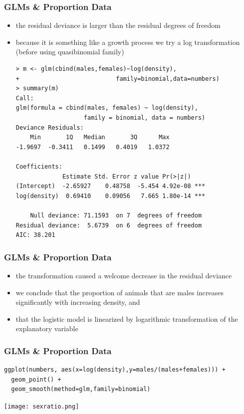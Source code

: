 \begin{frame}[fragile]\frametitle{GLMs \& Proportion Data}
  \begin{itemize}
  \item the residual deviance is larger than the residual degrees of freedom
  \item because it is something like a growth process we try a log transformation (before using quasibinomial family)\tiny
\begin{verbatim}
> m <- glm(cbind(males,females)~log(density),
+                           family=binomial,data=numbers)
> summary(m)
Call:
glm(formula = cbind(males, females) ~ log(density), 
                   family = binomial, data = numbers)
Deviance Residuals: 
    Min       1Q   Median       3Q      Max  
-1.9697  -0.3411   0.1499   0.4019   1.0372  

Coefficients:
             Estimate Std. Error z value Pr(>|z|)    
(Intercept)  -2.65927    0.48758  -5.454 4.92e-08 ***
log(density)  0.69410    0.09056   7.665 1.80e-14 ***

    Null deviance: 71.1593  on 7  degrees of freedom
Residual deviance:  5.6739  on 6  degrees of freedom
AIC: 38.201
\end{verbatim}
  \end{itemize}
\end{frame}

\begin{frame}[fragile]\frametitle{GLMs \& Proportion Data}
  \begin{itemize}
  \item the transformation caused a welcome decrease in the residual deviance
  \item we conclude that the proportion of animals that are males increases significantly with
increasing density, and 
\item that the logistic model is linearized by logarithmic transformation of the explanatory variable
  \end{itemize}
\end{frame}

\begin{frame}[fragile]\frametitle{GLMs \& Proportion Data}
\begin{verbatim}
ggplot(numbers, aes(x=log(density),y=males/(males+females))) +
  geom_point() +
  geom_smooth(method=glm,family=binomial)
\end{verbatim}
\begin{center}
\texttt{[image: sexratio.png]}
\end{center}
\end{frame}

